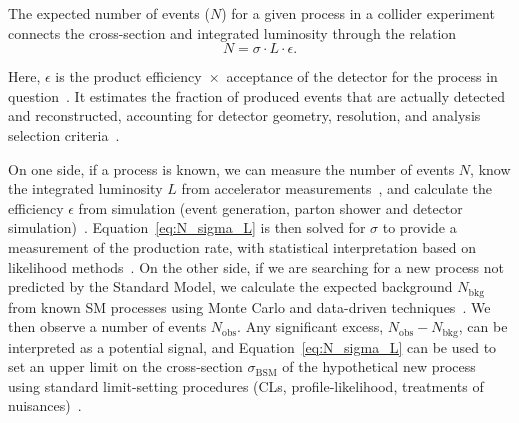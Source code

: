 The expected number of events ($N$) for a given process in a collider experiment connects the cross-section and integrated luminosity through the relation
\begin{equation}
N = \sigma \cdot L \cdot \epsilon.
\label{eq:N_sigma_L}
\end{equation}

Here, $\epsilon$ is the product efficiency~$\times$~acceptance of the detector for the process in question~\cite{CMS:PF2017,deFavereau:2013fsa}. It estimates the fraction of produced events that are actually detected and reconstructed, accounting for detector geometry, resolution, and analysis selection criteria~\cite{CMS:PF2017}.

On one side, if a process is known, we can measure the number of events $N$, know the integrated luminosity $L$ from accelerator measurements~\cite{lumiRef}, and calculate the efficiency $\epsilon$ from simulation (event generation, parton shower and detector simulation)~\cite{Alwall:2014hca,Sjostrand:2014zea,deFavereau:2013fsa}. Equation~\ref{eq:N_sigma_L} is then solved for $\sigma$ to provide a measurement of the production rate, with statistical interpretation based on likelihood methods~\cite{Cowan:2011}. On the other side, if we are searching for a new process not predicted by the Standard Model, we calculate the expected background $N_\text{bkg}$ from known SM processes using Monte Carlo and data-driven techniques~\cite{Alwall:2014hca,Cacciari:2011ma}. We then observe a number of events $N_\text{obs}$. Any significant excess, $N_\text{obs} - N_\text{bkg}$, can be interpreted as a potential signal, and Equation~\ref{eq:N_sigma_L} can be used to set an upper limit on the cross-section $\sigma_\text{BSM}$ of the hypothetical new process using standard limit-setting procedures (CLs, profile‑likelihood, treatments of nuisances)~\cite{Read:2002,Rolke:2005,FeldmanCousins:1998,Segura:2024srj}.

